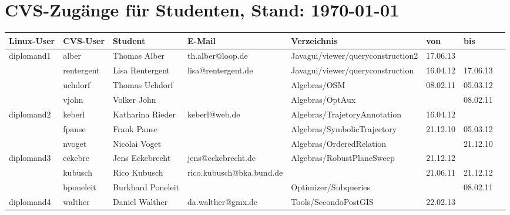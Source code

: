 \documentclass[a4paper,9pt,landscape]{scrartcl}
\begin{document}
\section{CVS-Zug\"ange f\"ur Studenten, Stand: \today}
\begin{longtabu}to 1\textwidth{|l|l|l|l|l|X|l|l|}
  \hline \hline
\textbf{Linux-User}        &\textbf{CVS-User}        &\textbf{Student}&\textbf{E-Mail}       &\textbf{Verzeichnis}              &\textbf{von} &\textbf{bis}\\
\hline
\hline\endhead
{}diplomand1 &alber  &Thomas Alber    &th.alber@loop.de      &Javagui/viewer/queryconstruction2 &17.06.13     &\\
            &rentergent               &Lisa Rentergent &lisa@rentergent.de    &Javagui/viewer/queryconstruction  &16.04.12     &17.06.13\\
            &uchdorf                  &Thomas Uchdorf  &                      &Algebras/OSM                      &08.02.11     &05.03.12\\
            &vjohn                    &Volker John     &                      &Algebras/OptAux                   &             &08.02.11\\
\hline
\hline
{}diplomand2 &keberl &Katharina Rieder&keberl@web.de         &Algebras/TrajetoryAnnotation      &16.04.12     &\\
          &fpanse                   &Frank Panse     &                      &Algebras/SymbolicTrajectory       &21.12.10     &05.03.12\\
          &nvoget                   &Nicolai Voget   &                      &Algebras/OrderedRelation          &             &21.12.10\\
\hline
\hline
{}diplomand3   &eckebre&Jens Eckebrecht &jens@eckebrecht.de    &Algebras/RobustPlaneSweep         &21.12.12     & \\
            &kubusch                  &Rico Kubusch    &rico.kubusch@bka.bund.de&                                &21.06.11     &21.12.12\\
            &bponeleit                &Burkhard Poneleit&                     &Optimizer/Subqueries              &             &08.02.11\\
\hline
\hline
{}diplomand4   &walther&Daniel Walther  &da.walther@gmx.de     &Tools/SecondoPostGIS              &22.02.13     &\\

\end{longtabu}
\end{document}
